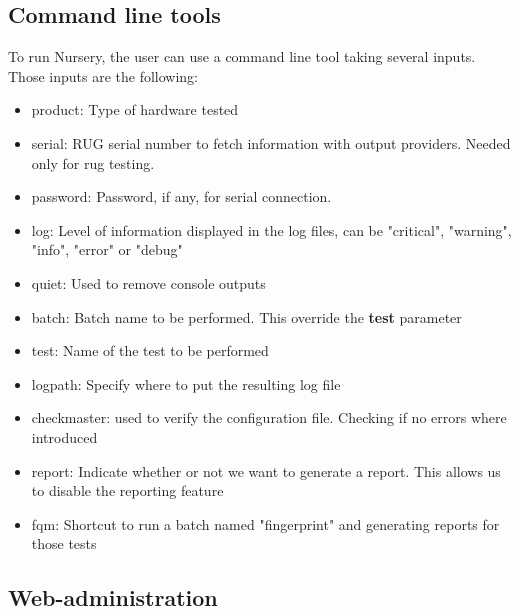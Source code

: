 \documentclass[12pt]{article}
\theoremstyle{definition}
\theoremstyle{definition}
\theoremstyle{remark}
\begin{document}
\subsection{Command line tools}

To run Nursery, the user can use a command line tool taking several inputs. Those inputs are the following:

\begin{itemize}
\item product: Type of hardware tested
\item serial: RUG serial number to fetch information with output providers. Needed only for \gls{rug} testing.
\item password: Password, if any, for serial connection.
\item log: Level of information displayed in the log files, can be "critical", "warning", "info", "error" or "debug"
\item quiet: Used to remove console outputs
\item batch: Batch name to be performed. This override the \textbf{test} parameter
\item test: Name of the test to be performed
\item logpath: Specify where to put the resulting log file
\item checkmaster: used to verify the configuration file. Checking if no errors where introduced
\item report: Indicate whether or not we want to generate a report. This allows us to disable the reporting feature
\item fqm: Shortcut to run a batch named "fingerprint" and generating reports for those tests
\end{itemize}


\subsection{Web-administration}
\end{document}
